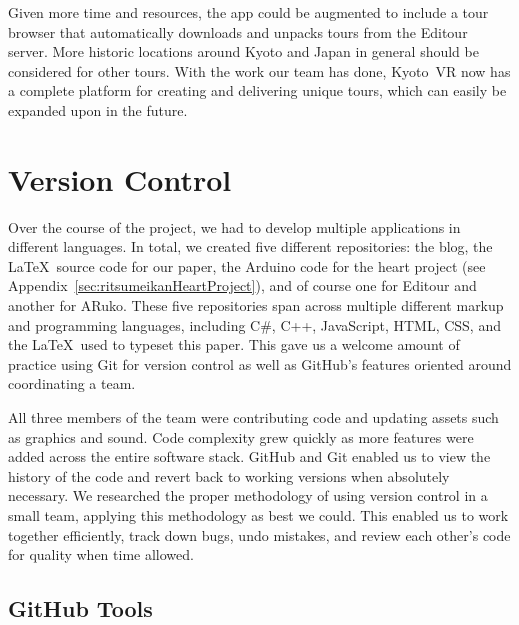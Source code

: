 \documentclass[a4paper, 10pt, american, titlepage]{article}
\begin{document}
Given more time and resources, the app could be augmented to include a tour
browser that automatically downloads and unpacks tours from the Editour server.
More historic locations around Kyoto and Japan in general should be considered
for other tours. With the work our team has done, Kyoto~VR now has a complete
platform for creating and delivering unique tours, which can easily be expanded
upon in the future.

\clearpage

\begin{singlespace}
	\printbibliography
\end{singlespace}

\clearpage

\appendices

\section{Version Control}
\label{sec:versionControl}

Over the course of the project, we had to develop multiple applications in
different languages. In total, we created five different repositories: the blog,
the \LaTeX~source code for our paper, the Arduino code for the heart project
(see Appendix~\ref{sec:ritsumeikanHeartProject}), and of course one for Editour
and another for ARuko. These five repositories span across multiple different
markup and programming languages, including C\#, C++, JavaScript, HTML, CSS, and
the \LaTeX~used to typeset this paper. This gave us a welcome amount of practice
using Git for version control as well as GitHub's features oriented around
coordinating a team.

All three members of the team were contributing code and updating assets such as
graphics and sound. Code complexity grew quickly as more features were added
across the entire software stack. GitHub and Git enabled us to view the history
of the code and revert back to working versions when absolutely necessary. We
researched the proper methodology of using version control in a small team,
applying this methodology as best we could. This enabled us to work together
efficiently, track down bugs, undo mistakes, and review each other's code for
quality when time allowed.

\subsection{GitHub Tools}
\label{sec:gitHubTools}
\end{document}
